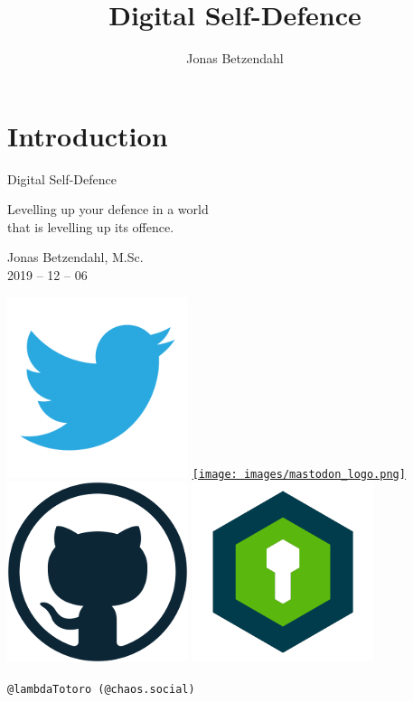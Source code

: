 \documentclass[aspectratio=1610,dvipsnames]{beamer}
\author{Jonas Betzendahl}
\title{Digital Self-Defence}
\begin{document}
\section{Introduction}

\begin{frame}
\begin{center}
\vfill
\huge Digital Self-Defence
\normalsize 
\smallskip
\smallskip

Levelling up your defence in a world\\ that is levelling up its offence.
\bigskip\bigskip

\large Jonas Betzendahl, M.Sc.\\
2019 -- 12 -- 06
\bigskip\bigskip

\href{https://twitter.com/lambdatotoro}{\includegraphics[scale=0.125]{images/twitter_logo.png}}
\href{https://chaos.social/@lambdatotoro}{\texttt{[image: images/mastodon\_logo.png]}}
\href{https://github.com/lambdaTotoro}{\includegraphics[scale=0.125]{images/github_logo.png}}
\href{https://whispeer.de/en/user/jbetzend}{\includegraphics[scale=0.125]{images/whispeer_logo.png}}

\texttt{@lambdaTotoro (@chaos.social)}
\end{center}
\end{frame}
\end{document}
